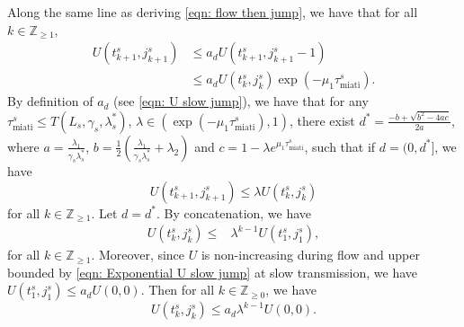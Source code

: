 Along the same line as deriving \eqref{eqn: flow then jump}, we have that for all $ k \in \mathbb{Z}_{\geq 1}$,
\begin{equation*}
    \begin{aligned}
        U(t^s_{k+1}, j^s_{k+1}) &\leq a_d U(t^s_{k+1},j^s_{k+1} - 1)
        \\
        &\leq a_d U(t_k^s, j_k^s) \exp (-\mu_1\tau_{\text{miati}}^s ).
    \end{aligned} 
\end{equation*}
By definition of $a_d$ (see \eqref{eqn: U slow jump}), we have that for any $\tau_{\text{miati}}^{s} \leq T(L_s, \gamma_s, \lambda_s^*)$, $\lambda \in (\exp (-\mu_1\tau_{\text{miati}}^s ), 1)$, there exist $d^* = \tfrac{-b+\sqrt{b^2-4ac}}{2a}$, where $a = \tfrac{\lambda_1}{\gamma_s \lambda_s^*}$, $b= \tfrac{1}{2}( \tfrac{\lambda_1}{\gamma_s \lambda_s^*} + \lambda_2)$ and $c = 1 - \lambda e^{\mu_1 \tau_{\text{miati}}^s}$, such that if $d = (0, d^*]$, we have
\begin{equation*}
    U(t^s_{k+1}, j^s_{k+1}) \leq \lambda U(t^s_k,j^s_k)
\end{equation*}
for all $k \in \mathbb{Z}_{\geq 1}$. Let $d = d^*$.
By concatenation, we have
\begin{equation*}
    \begin{aligned}
        U(t^s_k, j^s_k) \leq & \lambda^{k-1}U(t_1^s, j_1^s),
    \end{aligned}
\end{equation*}
for all $k \in \mathbb{Z}_{\geq 1}$. 
%
Moreover, since $U$ is non-increasing during flow and upper bounded by \eqref{eqn: Exponential U slow jump} at slow transmission, we have $ U(t_1^s,j_1^s) \leq  a_d U(0,0) $. Then for all $k \in \mathbb{Z}_{\geq 0}$, we have
\begin{equation}
    U(t_k^s, j_k^s) \leq a_d \lambda^{k-1} U(0,0). \label{eqn: Exponential U slow jump decay}
\end{equation}

